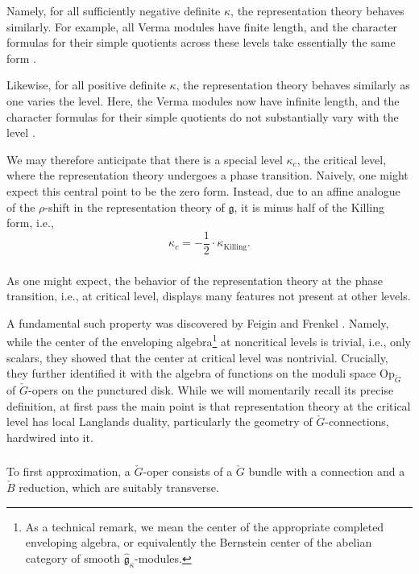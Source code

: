 \documentclass[10pt]{amsart}
\newcommand{\cB}{\check{B}}
\newcommand{\fgk}{\widehat{\fg}_\kappa}
\newcommand{\Op}{\mathrm{Op}_{\cG}}
\newcommand{\fg}{\mathfrak{g}}
\newcommand{\on}{\operatorname}
\theoremstyle{remark}
\numberwithin{equation}{section}
\newcommand{\cG}{\check{G}}
\begin{document}
Namely, for all sufficiently negative definite $\kappa$, the representation 
theory behaves similarly. For example, all Verma modules have finite length, 
and the character formulas for their simple quotients across these levels take 
essentially the same form \cite{kashiwaratanisakinegativeintegrallevel}. 

Likewise, for all positive definite $\kappa$, the 
representation theory behaves similarly as one varies the level. Here, the Verma modules now have infinite length, and the character formulas for 
their 
simple quotients do not substantially vary with the level \cite{kashiwara90}. 

We may therefore anticipate that there is a special level $\kappa_c$, the critical level, 
where the representation theory undergoes a phase transition. Naively, one 
might expect this central point to be the zero form. Instead, due to 
an 
affine analogue of the $\rho$-shift in the representation theory of $\fg$, it is 
minus half of the Killing form, i.e., 
%
\[
\kappa_c = - \frac{1}{2} \cdot \kappa_{\on{Killing}}.
\]
%



\subsubsection{} As one might expect, the behavior of the representation theory at 
the phase transition, i.e., at critical level, displays many features not 
present at other levels. 

A fundamental such property was discovered by Feigin and Frenkel \cite{feiginfrenkel91}. Namely, 
while the center of the enveloping algebra\footnote{As a technical remark, we 
mean the center of the appropriate completed enveloping algebra, or 
equivalently the 
Bernstein center of the abelian category of smooth $\fgk$-modules.} at 
noncritical levels is trivial, 
i.e., only scalars, they showed that the center at critical level was nontrivial.  
Crucially, they further identified it with the algebra of functions on the moduli space  $\Op$ of $\cG$-opers on the punctured disk. While we will momentarily recall its precise definition, at first pass 
the main point is that representation theory at the critical level has local 
Langlands duality, particularly the geometry of $\cG$-connections, hardwired into it. 


\subsubsection{} To first approximation, a $\cG$-oper consists of a $\cG$ bundle with a 
connection and a $\cB$ reduction, which are suitably transverse. 
\end{document}
